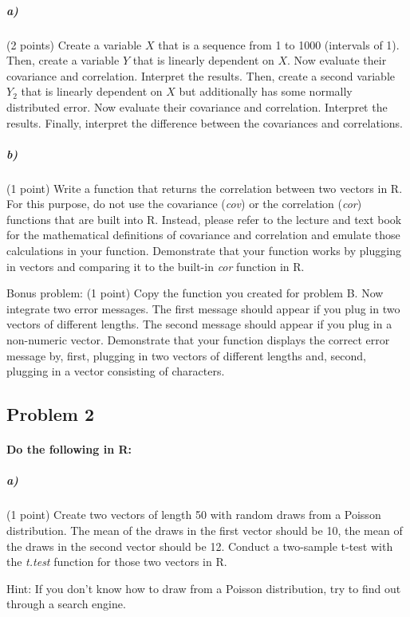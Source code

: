 \documentclass[12pt,letter]{article}
\begin{document}
\subparagraph{a)} (2 points) Create a variable $X$ that is a sequence from 1 to 1000 (intervals of 1). Then, create a variable $Y$ that is linearly dependent on $X$. Now evaluate their covariance and correlation. Interpret the results. Then, create a second variable $Y_2$ that is linearly dependent on $X$ but additionally has some normally distributed error. Now evaluate their covariance and correlation. Interpret the results. Finally, interpret the difference between the covariances and correlations.

\subparagraph{b)} (1 point) Write a function that returns the correlation between two vectors in R. For this purpose, do not use the covariance (\textit{cov}) or the correlation (\textit{cor}) functions that are built into R. Instead, please refer to the lecture and text book for the mathematical definitions of covariance and correlation and emulate those calculations in your function. Demonstrate that your function works by plugging in vectors and comparing it to the built-in \textit{cor} function in R.

\bigskip

Bonus problem: (1 point) Copy the function you created for problem B. Now integrate two error messages. The first message should appear if you plug in two vectors of different lengths. The second message should appear if you plug in a non-numeric vector. Demonstrate that your function displays the correct error message by, first, plugging in two vectors of different lengths and, second, plugging in a vector consisting of characters.



\subsection*{Problem 2}

\paragraph{Do the following in R:}

\subparagraph{a)} (1 point) Create two vectors of length 50 with random draws from a Poisson distribution. The mean of the draws in the first vector should be 10, the mean of the draws in the second vector should be 12. Conduct a two-sample t-test with the \textit{t.test} function for those two vectors in R.

Hint: If you don't know how to draw from a Poisson distribution, try to find out through a search engine.
\end{document}
